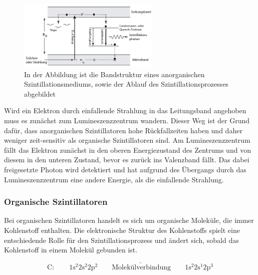                 \FloatBarrier

                \begin{figure}[h]
                  \centering
                  \includegraphics[width = 0.6\textwidth]{pictures/Bandstruktur.png}
                  \caption{In der Abbildung ist die Bandstruktur eines anorganischen Szintillationsmediums, sowie der Ablauf des Szintillationsprozesses abgebildet}
                  \label{fig:Bandstruktur}
                \end{figure}
        
                \FloatBarrier
        
                \noindent

                Wird ein Elektron durch einfallende Strahlung in das Leitungsband angehoben muss es zunächst zum Lumineszenzzentrum wandern. Dieser Weg ist der Grund dafür, dass anorganischen Szintillatoren
                hohe Rückfallzeiten haben und daher weniger zeit-sensitiv als organische Szintillatoren sind. Am Lumineszenzzentrum fällt das Elektron zunächst in den oberen Energiezustand des Zentrums und
                von diesem in den unteren Zustand, bevor es zurück ins Valenzband fällt. Das dabei freigesetzte Photon wird detektiert und hat aufgrund des Übergangs durch das Lumineszenzzentrum eine andere 
                Energie, als die einfallende Strahlung.


            \subsubsection*{Organische Szintillatoren}
                Bei organischen Szintillatoren handelt es sich um organische Moleküle, die immer Kohlenstoff enthalten. Die elektronische Struktur des Kohlenstoffs spielt eine entschiedende Rolle für den
                Szintillationsprozess und ändert sich, sobald das Kohlenstoff in einem Molekül gebunden ist.

                \begin{equation*}
                    \text{C}: \qquad 1\text{s}^2 2\text{s}^2 2\text{p}^2 \qquad \underrightarrow{\text{Molekülverbindung}} \qquad 1\text{s}^2 2\text{s}^1 2\text{p}^3
                \end{equation*}

